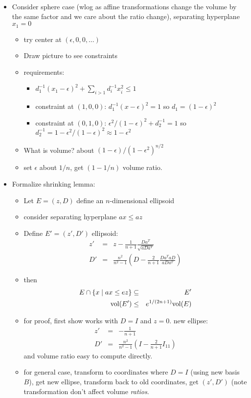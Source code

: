 \documentclass{article}
\newcommand\vol{{\mbox{vol}}}
\begin{document}
\begin{itemize}
\item  Consider sphere case (wlog as affine transformations change the volume by the same factor and we care about the ratio change), separating hyperplane $x_1=0$
\begin{itemize}
	\item try center at $(\epsilon,0,0,\ldots)$
	\item Draw picture to see constraints
	\item requirements:
	\begin{itemize}
		\item $d_1^{-1}(x_1-\epsilon )^2+\sum_{i > 1}d_i^{-1}x_i^2 \le 1$
		\item constraint at $(1,0,0)$: $d_1^{-1}(x-\epsilon )^2 = 1$ so $d_1 =
		(1-\epsilon )^2$
		\item constraint at $(0,1,0)$: $\epsilon ^2/(1-\epsilon )^2+d_2^{-1} = 1$ so $d_2^{-1}
		= 1-\epsilon ^2/(1-\epsilon )^2\approx 1-\epsilon ^2$
	\end{itemize}
	\item What is volume?  about $(1-\epsilon )/(1-\epsilon ^2)^{n/2}$
	\item set $\epsilon $ about $1/n$, get $(1-1/n)$ volume ratio.
\end{itemize}


\item Formalize shrinking lemma:
\begin{itemize}
	\item Let $E=(z,D)$ define an $n$-dimensional ellipsoid
	\item consider separating hyperplane $ax \le az$
	\item Define $E'=(z',D')$ ellipsoid:
	\begin{eqnarray*}
		z' &= &z-\frac{1}{n+1}\frac{Da^T}{\sqrt{aDa^T}}\\
		D' &= & \frac{n^2}{n^2-1}(D-\frac{2}{n+1}\frac{Da^TaD}{aDa^T})
	\end{eqnarray*}
	\item then
	\begin{eqnarray*}
		E \cap \set{x \mid ax \le ez} &\subseteq &E'\\
		\vol(E') &\le &e^{1/(2n+1)}\vol(E)
	\end{eqnarray*}
	\item for proof, first show works with $D=I$ and $z=0$.  new ellipse:
	\begin{eqnarray*}
		z' &=&-\frac1{n+1}\\
		D' &= & \frac{n^2}{n^2-1}(I-\frac{2}{n+1} I_{11})
	\end{eqnarray*}
	and volume ratio easy to compute directly.
	\item for general case, transform to coordinates where $D=I$ (using
	new basis $B$), get new ellipse, transform back to old coordinates,
	get $(z',D')$ (note transformation don't affect volume {\em ratios}.
\end{itemize}


\end{itemize}
\end{document}
